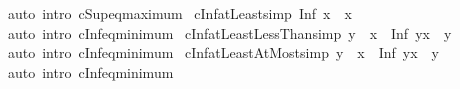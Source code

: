 \begin{isabellebody}
\isamarkupfalse%
\ {\isacharparenleft}{\kern0pt}auto\ intro{\isacharbang}{\kern0pt}{\isacharcolon}{\kern0pt}\ cSup{\isacharunderscore}{\kern0pt}eq{\isacharunderscore}{\kern0pt}maximum{\isacharparenright}{\kern0pt}%
\endisatagproof
{\isafoldproof}%
%
\isadelimproof
\isanewline
%
\endisadelimproof
\isanewline
{}\isamarkupfalse%
\ cInf{\isacharunderscore}{\kern0pt}atLeast{\isacharbrackleft}{\kern0pt}simp{\isacharbrackright}{\kern0pt}{\isacharcolon}{\kern0pt}\ {\isachardoublequoteopen}Inf\ {\isacharbraceleft}{\kern0pt}x{\isachardot}{\kern0pt}{\isachardot}{\kern0pt}{\isacharbraceright}{\kern0pt}\ {\isacharequal}{\kern0pt}\ x{\isachardoublequoteclose}\isanewline
%
\isadelimproof
\ \ %
\endisadelimproof
%
\isatagproof
{}\isamarkupfalse%
\ {\isacharparenleft}{\kern0pt}auto\ intro{\isacharbang}{\kern0pt}{\isacharcolon}{\kern0pt}\ cInf{\isacharunderscore}{\kern0pt}eq{\isacharunderscore}{\kern0pt}minimum{\isacharparenright}{\kern0pt}%
\endisatagproof
{\isafoldproof}%
%
\isadelimproof
\isanewline
%
\endisadelimproof
\isanewline
{}\isamarkupfalse%
\ cInf{\isacharunderscore}{\kern0pt}atLeastLessThan{\isacharbrackleft}{\kern0pt}simp{\isacharbrackright}{\kern0pt}{\isacharcolon}{\kern0pt}\ {\isachardoublequoteopen}y\ {\isacharless}{\kern0pt}\ x\ {\isasymLongrightarrow}\ Inf\ {\isacharbraceleft}{\kern0pt}y{\isachardot}{\kern0pt}{\isachardot}{\kern0pt}{\isacharless}{\kern0pt}x{\isacharbraceright}{\kern0pt}\ {\isacharequal}{\kern0pt}\ y{\isachardoublequoteclose}\isanewline
%
\isadelimproof
\ \ %
\endisadelimproof
%
\isatagproof
{}\isamarkupfalse%
\ {\isacharparenleft}{\kern0pt}auto\ intro{\isacharbang}{\kern0pt}{\isacharcolon}{\kern0pt}\ cInf{\isacharunderscore}{\kern0pt}eq{\isacharunderscore}{\kern0pt}minimum{\isacharparenright}{\kern0pt}%
\endisatagproof
{\isafoldproof}%
%
\isadelimproof
\isanewline
%
\endisadelimproof
\isanewline
{}\isamarkupfalse%
\ cInf{\isacharunderscore}{\kern0pt}atLeastAtMost{\isacharbrackleft}{\kern0pt}simp{\isacharbrackright}{\kern0pt}{\isacharcolon}{\kern0pt}\ {\isachardoublequoteopen}y\ {\isasymle}\ x\ {\isasymLongrightarrow}\ Inf\ {\isacharbraceleft}{\kern0pt}y{\isachardot}{\kern0pt}{\isachardot}{\kern0pt}x{\isacharbraceright}{\kern0pt}\ {\isacharequal}{\kern0pt}\ y{\isachardoublequoteclose}\isanewline
%
\isadelimproof
\ \ %
\endisadelimproof
%
\isatagproof
{}\isamarkupfalse%
\ {\isacharparenleft}{\kern0pt}auto\ intro{\isacharbang}{\kern0pt}{\isacharcolon}{\kern0pt}\ cInf{\isacharunderscore}{\kern0pt}eq{\isacharunderscore}{\kern0pt}minimum{\isacharparenright}{\kern0pt}%

\end{isabellebody}

